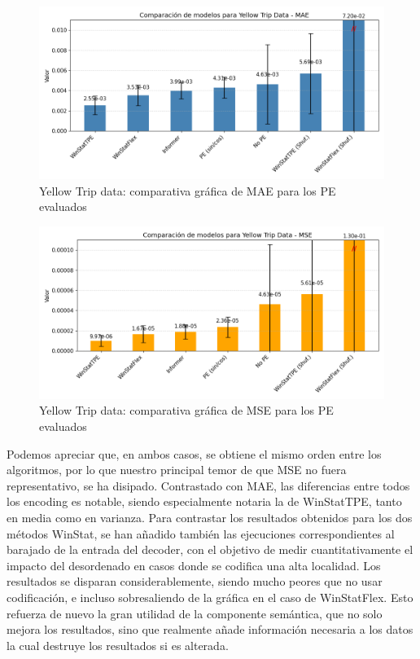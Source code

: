 \begin{figure}[!ht]
	\centering
	\includegraphics[scale=0.475]{img/taxifinalmae}
	\caption{Yellow Trip data: comparativa gráfica de MAE para los PE evaluados}
	\label{taxifinalmae}
\end{figure}

\begin{figure}[!ht]
	\centering
	\includegraphics[scale=0.475]{img/taxifinalmse}
	\caption{Yellow Trip data: comparativa gráfica de MSE para los PE evaluados}
	\label{taxifinalmse}
\end{figure}

Podemos apreciar que, en ambos casos, se obtiene el mismo orden entre los algoritmos, por lo que nuestro principal temor de que MSE no fuera representativo, se ha disipado. Contrastado con MAE, las diferencias entre todos los encoding es notable, siendo especialmente notaria la de WinStatTPE, tanto en media como en varianza. Para contrastar los resultados obtenidos para los dos métodos WinStat, se han añadido también las ejecuciones correspondientes al barajado de la entrada del decoder, con el objetivo de medir cuantitativamente el impacto del desordenado en casos donde se codifica una alta localidad. Los resultados se disparan considerablemente, siendo mucho peores que no usar codificación, e incluso sobresaliendo de la gráfica en el caso de WinStatFlex. Esto refuerza de nuevo la gran utilidad de la componente semántica, que no solo mejora los resultados, sino que realmente añade información necesaria a los datos la cual destruye los resultados si es alterada.\\

